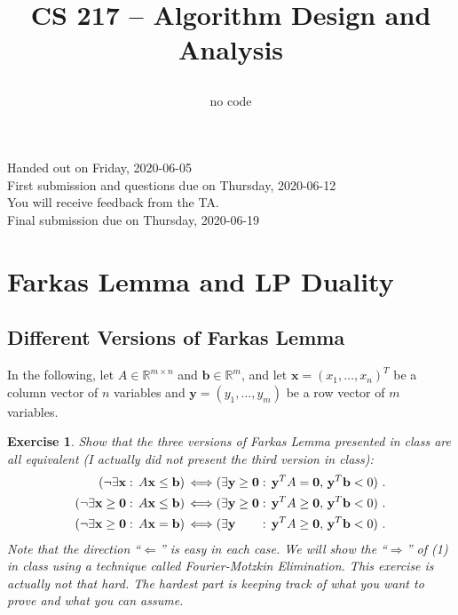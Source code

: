 \documentclass[12pt,a4]{article}
\newcommand{\handoutdate}{Friday, 2020-06-05}
\newcommand{\firstduedate}{Thursday, 2020-06-12}
\newcommand{\finalduedate}{Thursday, 2020-06-19}
\newcommand{\R}{\mathbb{R}}
\newtheorem{exercise}[theorem]{Exercise}
\begin{document}
\date{}

\title{CS 217 -- Algorithm Design and Analysis \\ 
  \vspace{3mm}
\author{no code}
}
\maketitle

\noindent
Handed out on \handoutdate{}\\
First submission and questions due on \firstduedate{}\\
You will receive feedback from the TA.\\
Final submission due on \finalduedate{}





\newcommand{\rank}{\textnormal{rank}}
\newcommand{\y}{\mathbf{y}}
\renewcommand{\c}{\mathbf{c}}
\newcommand{\x}{\mathbf{x}}
\newcommand{\z}{\mathbf{z}}
\renewcommand{\u}{\mathbf{u}}
\newcommand{\V}{\mathbf{v}}

\renewcommand{\a}{\mathbf{a}}

\renewcommand{\b}{\mathbf{b}} 
\newcommand{\zero}{\mathbf{0}}
\newcommand{\rpn}{\mathbb{R}_{\geq 0}}
\newcommand{\sol}{\textup{\textrm{sol}}}
\newcommand{\opt}{\textup{\textrm{opt}}}
\setcounter{section}{6}


\section{Farkas Lemma and LP Duality}

\subsection{Different Versions of Farkas Lemma}

In the following, let $A \in \R^{m \times n}$ and $\b \in \R^m$, and let 
$\x = (x_1,\dots,x_n)^T$ be a column vector of $n$ variables and 
$\y = (y_1, \dots,y_m)$ be a row vector of $m$ variables.

\begin{exercise}
 Show that the three versions of Farkas Lemma presented in class are all equivalent (I actually did not present
 the third version in class):
 \begin{align}
   ( \neg \exists \x : \, A \x \leq \b ) \, & \Longleftrightarrow 
    ( \exists \y \geq \zero : \, \y^T A = \zero, \,     \y^T \b < 0 ) \ . \\
      ( \neg \exists \x \geq \zero : \, A \x \leq \b ) \, & \Longleftrightarrow 
    ( \exists \y \geq \zero : \, \y^T A \geq \zero, \,  \y^T \b < 0 ) \ . \\
   ( \neg \exists \x \geq \zero : \, A \x = \b ) \, & \Longleftrightarrow 
    ( \exists \y \begingroup \color{white} \geq \zero \endgroup : \, \y^T A \geq \zero, \,  \y^T \b < 0 ) \ .
 \end{align}
  Note that the direction ``$\Longleftarrow$'' is easy in each case. 
  We will show the ``$\Longrightarrow$'' of (1) in class using a technique called {\em Fourier-Motzkin Elimination}. 
  This exercise is actually not that hard. The hardest part is keeping track of what you 
  want to prove and what you can assume.
\end{exercise}
\end{document}
